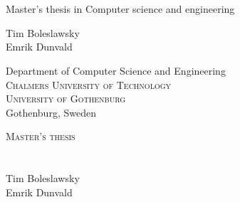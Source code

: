 
{ %


\begin{titlepage}
			
\addtolength{\voffset}{2cm}

\begin{figure}[H]
\centering
\vspace{1cm}	%
\end{figure}

\mbox{}
\vfill
\renewcommand{\familydefault}{\sfdefault} \normalfont %

\textbf{\Huge \multiLineTitle{0.2cm}} 
\\[0.5cm]

{\Large \oneLineSubtitle}\\[0.5cm]


Master's thesis in Computer science and engineering \setlength{\parskip}{1cm}

{\Large Tim Boleslawsky} \setlength{\parskip}{2.9cm} \\
{\Large Emrik Dunvald} \setlength{\parskip}{2.9cm}

Department of Computer Science and Engineering \\
\textsc{Chalmers University of Technology} \\
\textsc{University of Gothenburg} \\
Gothenburg, Sweden \the\year

\renewcommand{\familydefault}{\rmdefault} \normalfont %
\end{titlepage}


\newpage
\restoregeometry
\thispagestyle{empty}
\mbox{}


\newpage
\thispagestyle{empty}
\begin{center}
	\textsc{\large Master's thesis \the\year}\\[4cm]		%
	\textbf{\Large \multiLineTitle{0.2cm}} \\[1cm]
	{\large \oneLineSubtitle}\\[1cm]
	{\large Tim Boleslawsky}\\
	{\large Emrik Dunvald}
	

\end{center}}
